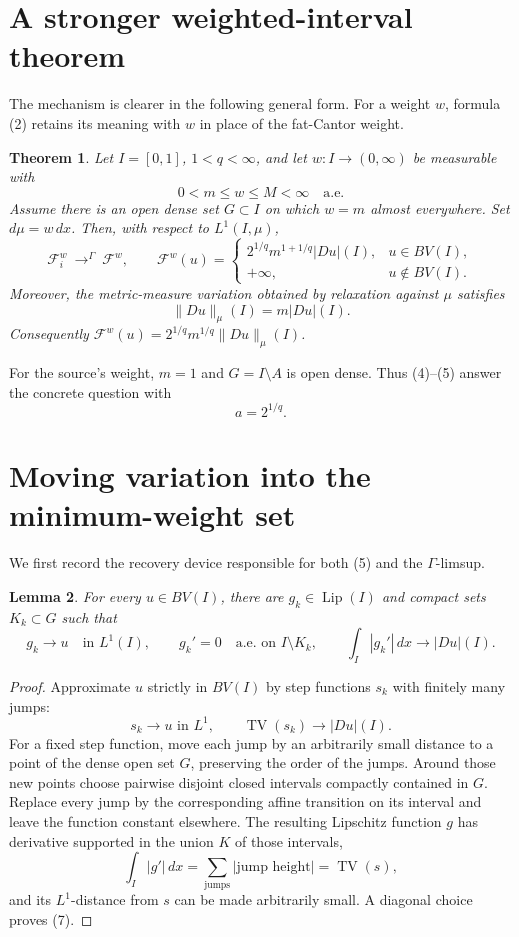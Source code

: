 \documentclass[11pt]{article}
\newtheorem{theorem}{Theorem}
\newtheorem{lemma}[theorem]{Lemma}
\newcommand{\F}{\mathcal F}
\newcommand{\TV}{\operatorname{TV}}
\newcommand{\Lip}{\operatorname{Lip}}
\begin{document}
\section{A stronger weighted-interval theorem}

The mechanism is clearer in the following general form. For a weight
\(w\), formula (2) retains its meaning with \(w\) in place of the
fat-Cantor weight.

\begin{theorem}\label{thm:main}
Let \(I=[0,1]\), \(1<q<\infty\), and let \(w:I\to(0,\infty)\) be
measurable with
\[
 0<m\le w\le M<\infty\quad\text{a.e.}
 \tag{3}
\]
Assume there is an open dense set \(G\subset I\) on which \(w=m\)
almost everywhere. Set \(d\mu=w\,dx\). Then, with respect to
\(L^1(I,\mu)\),
\[
 \F_i^w\ \mathop{\longrightarrow}^{\Gamma}\
 \F^w,\qquad
 \F^w(u)=
 \begin{cases}
 2^{1/q}m^{1+1/q}|Du|(I),&u\in BV(I),\\
 +\infty,&u\notin BV(I).
 \end{cases}
 \tag{4}
\]
Moreover, the metric-measure variation obtained by relaxation against
\(\mu\) satisfies
\[
 \|Du\|_\mu(I)=m|Du|(I).
 \tag{5}
\]
Consequently \(\F^w(u)=2^{1/q}m^{1/q}\|Du\|_\mu(I)\).
\end{theorem}

For the source's weight, \(m=1\) and \(G=I\setminus A\) is open dense.
Thus (4)--(5) answer the concrete question with
\[
 a=2^{1/q}.
 \tag{6}
\]

\section{Moving variation into the minimum-weight set}

We first record the recovery device responsible for both (5) and the
\(\Gamma\)-limsup.

\begin{lemma}\label{lem:recovery}
For every \(u\in BV(I)\), there are \(g_k\in\Lip(I)\) and compact sets
\(K_k\subset G\) such that
\[
 g_k\to u\quad\text{in }L^1(I),\qquad
 g_k'=0\quad\text{a.e. on }I\setminus K_k,\qquad
 \int_I|g_k'|\,dx\longrightarrow |Du|(I).
 \tag{7}
\]
\end{lemma}

\begin{proof}
Approximate \(u\) strictly in \(BV(I)\) by step functions \(s_k\) with
finitely many jumps:
\[
 s_k\to u\text{ in }L^1,\qquad
 \TV(s_k)\to|Du|(I).
\]
For a fixed step function, move each jump by an arbitrarily small
distance to a point of the dense open set \(G\), preserving the order of
the jumps. Around those new points choose pairwise disjoint closed
intervals compactly contained in \(G\). Replace every jump by the
corresponding affine transition on its interval and leave the function
constant elsewhere. The resulting Lipschitz function \(g\) has
derivative supported in the union \(K\) of those intervals,
\[
 \int_I|g'|\,dx=\sum_{\text{jumps}}|\text{jump height}|=\TV(s),
\]
and its \(L^1\)-distance from \(s\) can be made arbitrarily small.
A diagonal choice proves (7).
\end{proof}
\end{document}
